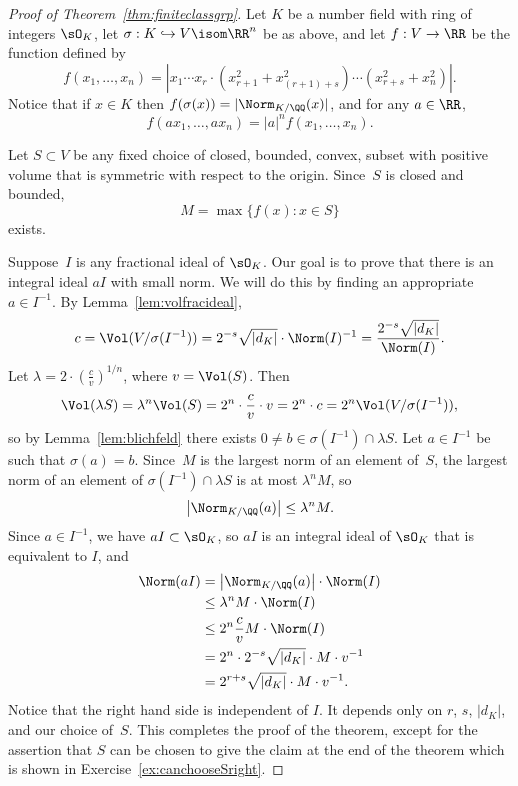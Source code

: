 \begin{proof}[Proof of Theorem~\ref{thm:finiteclassgrp}]
	Let $K$ be a number field with ring of integers $\sO_K$,
	let $\sigma:K \hookrightarrow V \isom \RR^n$ be as above,
	and let $f:V\to \RR$ be the function defined by
	$$
	f(x_1,\dots, x_n)
	= \left|
	x_1 \cdots x_r\cdot (x_{r+1}^2 + x_{(r+1)+s}^2)\cdots (x_{r+s}^2 + x_n^2)
	\right|.
	$$
	Notice that if $x\in K$ then $f(\sigma(x)) = |\Norm_{K/\QQ}(x)|$,
	and for any $a\in \RR$,
	$$
	f(ax_1, \dots,  ax_n) = |a|^n f(x_1,\dots, x_n).
	$$
	
	Let $S\subset V$ be any fixed choice of closed, bounded, convex, subset with
	positive volume that is symmetric with respect to the origin.
	Since~$S$ is closed and bounded,
	$$
	M = \max\{f(x) : x \in S\}
	$$
	exists.
	
	Suppose~$I$ is any  fractional ideal of $\sO_K$.  Our goal
	is to prove that there is an integral ideal $aI$ with small norm. We
	will do this by finding an appropriate $a\in I^{-1}$.
	By Lemma~\ref{lem:volfracideal},
	$$
	c = \Vol(V/\sigma(I^{-1}))
	= 2^{-s}\sqrt{|d_K|}\cdot \Norm(I)^{-1}
	= \frac{2^{-s} \sqrt{|d_K|}}{\Norm(I)}.
	$$
	Let $\lambda = 2\cdot\left(\frac{c}{v}\right)^{1/n}$, where $v=\Vol(S)$.
	Then
	$$
	\Vol(\lambda{} S) = \lambda^n \Vol(S)
	= 2^n\cdot \frac{c}{v} \cdot v
	= 2^n\cdot c
	= 2^n \Vol(V/\sigma(I^{-1})),
	$$
	so by Lemma~\ref{lem:blichfeld} there exists
	$0\neq b\in \sigma(I^{-1}) \cap \lambda S$.
	Let $a \in I^{-1}$ be such that $\sigma(a)=b$.
	Since~$M$ is the largest norm of an element of~$S$, the largest norm
	of an element of $\sigma(I^{-1})\cap  \lambda{}S$ is at most $\lambda^n M$,
	so
	$$
	\left|\Norm_{K/\QQ}(a)\right| \leq \lambda^n M.
	$$
	Since $a\in I^{-1}$, we have $aI \subset \sO_K$, so
	$aI$ is an integral ideal of $\sO_K$ that is equivalent to $I$, and
	\begin{align*}
	\Norm(aI) &= \left|\Norm_{K/\QQ}(a)\right|\cdot \Norm(I) \\
	&\leq \lambda^n M\cdot \Norm(I) \\
	&\leq 2^n \frac{c}{v} M \cdot \Norm(I) \\
	&= 2^n\cdot 2^{-s} \sqrt{|d_K|} \cdot M \cdot v^{-1} \\
	&= 2^{r+s} \sqrt{|d_K|} \cdot M \cdot v^{-1}.
	\end{align*}
	Notice that the right hand side is independent of $I$.  It
	depends only on $r$, $s$, $|d_K|$, and our choice of~$S$.
	This completes the proof of the theorem, except for
	the assertion that $S$ can be chosen to give the claim
	at the end of the theorem which is shown in Exercise~\ref{ex:canchooseSright}.
\end{proof}

